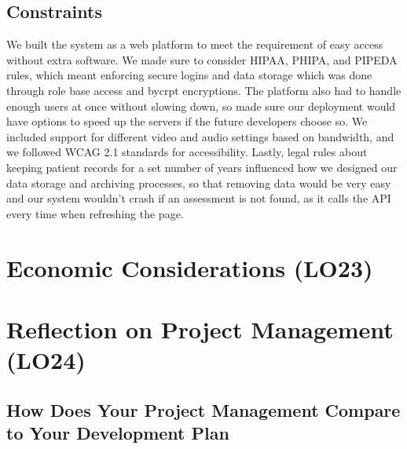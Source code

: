 \documentclass{article}
\begin{document}
\subsection{Constraints}
\hspace{2em}We built the system as a web platform to meet the requirement of easy access without extra software. We made sure 
to consider HIPAA, PHIPA, and PIPEDA rules, which meant enforcing secure logins and data storage which was done through role base access and bycrpt encryptions. 
The platform also had to handle enough users at once without slowing down, so made sure our deployment would have options to speed up the servers if the 
future developers choose so. We included support for different video and audio settings based on bandwidth, and we followed 
WCAG 2.1 standards for accessibility. Lastly, legal rules about keeping patient records for a set number of years 
influenced how we designed our data storage and archiving processes, so that removing data would be very easy and our system wouldn't crash if an assessment is not found, as it calls the API every time when refreshing the page. 

\newpage

\section{Economic Considerations (LO23)}


\newpage

\section{Reflection on Project Management (LO24)}


\subsection{How Does Your Project Management Compare to Your Development Plan}
\end{document}
